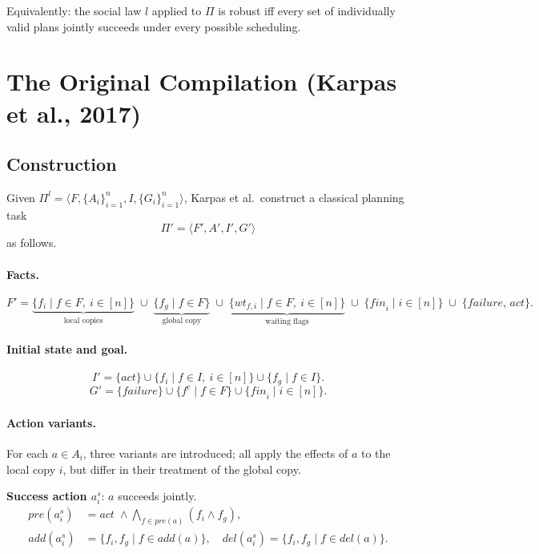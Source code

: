 \documentclass{article}
\theoremstyle{definition}
\newcommand{\pre}{\mathit{pre}}
\newcommand{\add}{\mathit{add}}
\newcommand{\del}{\mathit{del}}
\newcommand{\act}{\mathit{act}}
\begin{document}
Equivalently: the social law $l$ applied to $\Pi$ is robust iff every set of individually valid plans jointly succeeds under every possible scheduling.

\section{The Original Compilation (Karpas et al., 2017)}

\subsection{Construction}

Given $\Pi^l = \langle F, \{A_i\}_{i=1}^n, I, \{G_i\}_{i=1}^n \rangle$, Karpas et al.\ construct a classical planning task
\[
  \Pi' = \langle F', A', I', G' \rangle
\]
as follows.

\paragraph{Facts.}
\[
  F' = \underbrace{\{f_i \mid f \in F,\ i \in [n]\}}_{\text{local copies}}
  \;\cup\; \underbrace{\{f_g \mid f \in F\}}_{\text{global copy}}
  \;\cup\; \underbrace{\{\mathit{wt}_{f,i} \mid f \in F,\ i \in [n]\}}_{\text{waiting flags}}
  \;\cup\; \{\mathit{fin}_i \mid i \in [n]\}
  \;\cup\; \{\mathit{failure},\, \act\}.
\]

\paragraph{Initial state and goal.}
\[
  I' = \{\act\} \cup \{f_i \mid f \in I,\ i \in [n]\} \cup \{f_g \mid f \in I\}.
\]
\[
  G' = \{\mathit{failure}\} \cup \{f^c \mid f \in F\} \cup \{\mathit{fin}_i \mid i \in [n]\}.
\]

\paragraph{Action variants.}
For each $a \in A_i$, three variants are introduced; all apply the effects of $a$ to the local copy $i$, but differ in their treatment of the global copy.

\medskip
\noindent\textbf{Success action $a_i^s$}: $a$ succeeds jointly.
\begin{align*}
  \pre(a_i^s) &= \act \;\wedge \textstyle\bigwedge_{f \in \pre(a)} (f_i \wedge f_g), \\
  \add(a_i^s) &= \{f_i, f_g \mid f \in \add(a)\}, \quad
  \del(a_i^s) = \{f_i, f_g \mid f \in \del(a)\}.
\end{align*}
\end{document}
